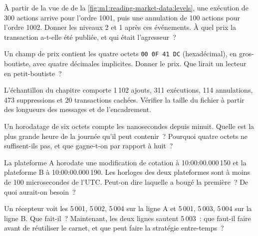 \begin{exercise}[$\star$]\label{exo:m1:reading-market-data:1}
À partir de la vue de  de la \cref{fig:m1:reading-market-data:levels}, une exécution
de 300 actions arrive pour l'ordre 1001, puis une annulation de 100 actions pour l'ordre
1002. Donner les niveaux 2 et 1 après ces événements. À quel prix la transaction a-t-elle
été publiée, et qui était l'agresseur~?
\end{exercise}

\begin{exercise}[$\star$]\label{exo:m1:reading-market-data:2}
Un champ de prix contient les quatre octets \texttt{00 0F 41 DC} (hexadécimal),
en gros-boutiste, avec quatre décimales implicites. Donner le prix. Que lirait un
lecteur en petit-boutiste~?
\end{exercise}

\begin{exercise}[$\star$]\label{exo:m1:reading-market-data:3}
L'échantillon du chapitre comporte 1\,102 ajouts, 311 exécutions, 114 annulations, 473 suppressions
et 20 transactions cachées. Vérifier la taille du fichier à partir des longueurs des messages
et de l'encadrement.
\end{exercise}

\begin{exercise}[$\star\star$]\label{exo:m1:reading-market-data:4}
Un horodatage de six octets compte les nanosecondes depuis minuit. Quelle est la plus grande
heure de la journée qu'il peut contenir~? Pourquoi quatre octets ne suffisent-ils pas, et que
gagne-t-on par rapport à huit~?
\end{exercise}

\begin{exercise}[$\star\star$]\label{exo:m1:reading-market-data:5}
La plateforme A horodate une modification de cotation à 10:00:00.000\,150 et la plateforme B
à 10:00:00.000\,190. Les horloges des deux plateformes sont à moins de 100 microsecondes de
l'UTC. Peut-on dire laquelle a bougé la première~? De quoi aurait-on besoin~?
\end{exercise}

\begin{exercise}[$\star\star$]\label{exo:m1:reading-market-data:6}
Un récepteur voit les  5\,001, 5\,002, 5\,004 sur la ligne A et 5\,001,
5\,003, 5\,004 sur la ligne B. Que fait-il~? Maintenant, les deux lignes sautent 5\,003~:
que faut-il faire avant de réutiliser le carnet, et que peut faire la stratégie
entre-temps~?
\end{exercise}

